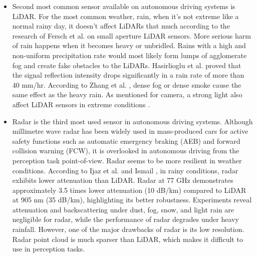 \documentclass[rnd]{mas_proposal}
\begin{document}
\begin{itemize}
    \item Second most common sensor available on autonomous driving systems is LiDAR. For the most common weather, rain, when it’s not extreme like a normal rainy day, it doesn’t affect LiDARs that much according to the research of Fersch et al. \cite{fersch2016influence} on small aperture LiDAR sensors. More serious harm of rain happens when it becomes heavy or unbridled. Rains with a high and non-uniform precipitation rate would most likely form lumps of agglomerate fog and create fake obstacles to the LiDARs. Hasirlioglu et al. \cite{hasirlioglu2016modeling} proved that the signal reflection intensity drops significantly in a rain rate of more than 40 mm/hr. According to Zhang et al. \cite{Zhang2021Dec}, dense fog or dense smoke cause the same effect as the heavy rain. As mentioned for camera, a strong light also affect LiDAR sensors in extreme conditions \cite{acarballo2020libre}.
    

    \item Radar is the third most used sensor in autonomous driving systems. Although millimetre wave radar has been widely used in mass-produced cars for active safety functions such as automatic emergency braking (AEB) and forward collision warning (FCW), it is overlooked in autonomous driving from the perception task point-of-view. Radar seems to be more resilient in weather conditions. According to Ijaz et al. \cite{ijaz2012analysis} and Ismail \cite{gultepe2008measurements}, in rainy conditions, radar exhibits lower attenuation than LiDAR. Radar at 77 GHz demonstrates approximately 3.5 times lower attenuation (10 dB/km) compared to LiDAR at 905 nm (35 dB/km), highlighting its better robustness. Experiments \cite{adams2012robotic} \cite{brooker2007seeing} \cite{xu2022learned} \cite{gourova2017analysis} \cite{zang2019impact} \cite{adams2012robotic} reveal attenuation and backscattering under dust, fog, snow, and light rain are negligible for radar, while the performance of radar degrades under heavy rainfall. However, one of the major drawbacks of radar is its low resolution. Radar point cloud is much sparser than LiDAR, which makes it difficult to use in perception tasks.



\end{itemize}
\end{document}
